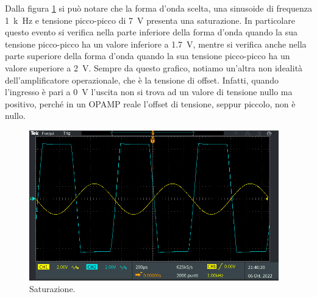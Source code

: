 \documentclass{report}
\begin{document}
Dalla figura \ref{figura:satur} si può notare che la forma d'onda scelta, una sinusoide di frequenza \SI{1}{k\hertz} e tensione picco-picco di \SI{7}{\volt} presenta una saturazione. In particolare questo evento si verifica nella parte inferiore della forma d'onda quando la sua tensione picco-picco ha un valore inferiore a \SI{1.7}{\volt}, mentre si verifica anche nella parte superiore della forma d'onda quando la sua tensione picco-picco ha un valore superiore a \SI{2}{\volt}. Sempre da questo grafico, notiamo un'altra non idealità dell'amplificatore operazionale, che è la tensione di offset. Infatti, quando l'ingresso è pari a \SI{0}{\volt} l'uscita non si trova ad un valore di tensione nullo ma positivo, perché in un OPAMP reale l'offset di tensione, seppur piccolo, non è nullo. %
\begin{figure}[h!]
	\centering
	\includegraphics[height=6.5cm]{immagini/TEK00015}
	\caption{Saturazione.}
	\label{figura:satur}
\end{figure}



\end{document}
